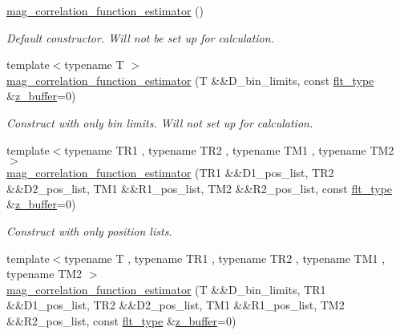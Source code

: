 \begin{DoxyCompactItemize}
\item 
\hyperlink{classIceBRG_1_1mag__correlation__function__estimator_abb52bbca993182ccb4174301c34b114c}{mag\+\_\+correlation\+\_\+function\+\_\+estimator} ()
\begin{DoxyCompactList}\small\item\em Default constructor. Will not be set up for calculation. \end{DoxyCompactList}\item 
{\footnotesize template$<$typename T $>$ }\\\hyperlink{classIceBRG_1_1mag__correlation__function__estimator_af5467ccdbc613e37395d541d3560523b}{mag\+\_\+correlation\+\_\+function\+\_\+estimator} (T \&\&D\+\_\+bin\+\_\+limits, const \hyperlink{lib_2IceBRG__main_2common_8h_ad0f130a56eeb944d9ef2692ee881ecc4}{flt\+\_\+type} \&\hyperlink{magic__values_8hpp_a424f49a8036e9de5962c718fb785356f}{z\+\_\+buffer}=0)
\begin{DoxyCompactList}\small\item\em Construct with only bin limits. Will not set up for calculation. \end{DoxyCompactList}\item 
{\footnotesize template$<$typename T\+R1 , typename T\+R2 , typename T\+M1 , typename T\+M2 $>$ }\\\hyperlink{classIceBRG_1_1mag__correlation__function__estimator_a2593a1c26ad9bd49311f996fb3b23cea}{mag\+\_\+correlation\+\_\+function\+\_\+estimator} (T\+R1 \&\&D1\+\_\+pos\+\_\+list, T\+R2 \&\&D2\+\_\+pos\+\_\+list, T\+M1 \&\&R1\+\_\+pos\+\_\+list, T\+M2 \&\&R2\+\_\+pos\+\_\+list, const \hyperlink{lib_2IceBRG__main_2common_8h_ad0f130a56eeb944d9ef2692ee881ecc4}{flt\+\_\+type} \&\hyperlink{magic__values_8hpp_a424f49a8036e9de5962c718fb785356f}{z\+\_\+buffer}=0)
\begin{DoxyCompactList}\small\item\em Construct with only position lists. \end{DoxyCompactList}\item 
{\footnotesize template$<$typename T , typename T\+R1 , typename T\+R2 , typename T\+M1 , typename T\+M2 $>$ }\\\hyperlink{classIceBRG_1_1mag__correlation__function__estimator_a77ea4cbd453bb57666dbe4f8f6322632}{mag\+\_\+correlation\+\_\+function\+\_\+estimator} (T \&\&D\+\_\+bin\+\_\+limits, T\+R1 \&\&D1\+\_\+pos\+\_\+list, T\+R2 \&\&D2\+\_\+pos\+\_\+list, T\+M1 \&\&R1\+\_\+pos\+\_\+list, T\+M2 \&\&R2\+\_\+pos\+\_\+list, const \hyperlink{lib_2IceBRG__main_2common_8h_ad0f130a56eeb944d9ef2692ee881ecc4}{flt\+\_\+type} \&\hyperlink{magic__values_8hpp_a424f49a8036e9de5962c718fb785356f}{z\+\_\+buffer}=0)

\end{DoxyCompactItemize}
